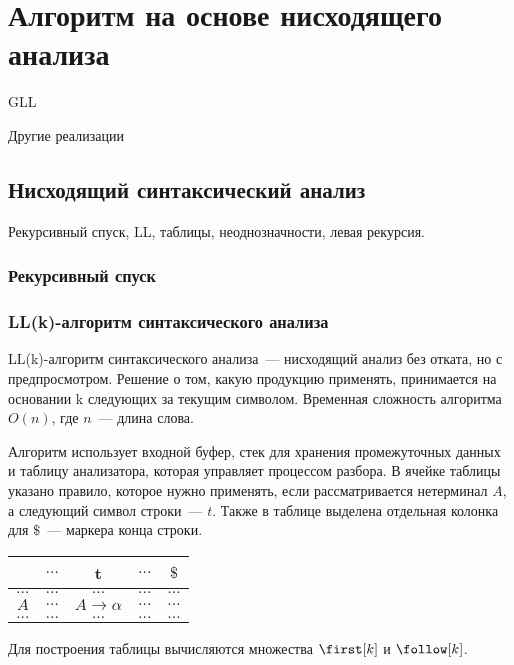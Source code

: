 \section{Алгоритм на основе нисходящего анализа}

GLL~\cite{Grigorev:2017:CPQ:3166094.3166104}

Другие реализации~\cite{MEDEIROS201975}

\subsection{Нисходящий синтаксический анализ}

Рекурсивный спуск, LL, таблицы, неоднозначности, левая рекурсия.

\subsubsection{Рекурсивный спуск}

\subsubsection{LL(k)-алгоритм синтаксического анализа}

LL(k)-алгоритм синтаксического анализа~--- нисходящий анализ без отката, но с предпросмотром.
Решение о том, какую продукцию применять, принимается на основании k следующих за текущим символом.
Временная сложность алгоритма $O(n)$, где $n$~--- длина слова.

Алгоритм использует входной буфер, стек для хранения промежуточных данных и таблицу анализатора, которая управляет процессом разбора.
В ячейке таблицы указано правило, которое нужно применять, если рассматривается нетерминал $A$, а следующий символ строки~--- $t$.
Также в таблице выделена отдельная колонка для $\$$~--- маркера конца строки.

\begin{center}
  \begin{tabular}{ c || c | c | c | c }
             & $\dots$ & t & $\dots$ & $\$$ \\ \hline
    $\dots$  & $\dots$ & $\dots$ & $\dots$ & $\dots$ \\ \hline
    $A$  & $\dots$ & $A \to \alpha$ & $\dots$ & $\dots$ \\ \hline
    $\dots$  & $\dots$ & $\dots$ & $\dots$ & $\dots$
  \end{tabular}
\end{center}

Для построения таблицы вычисляются множества $\first[k]$ и $\follow[k]$.

